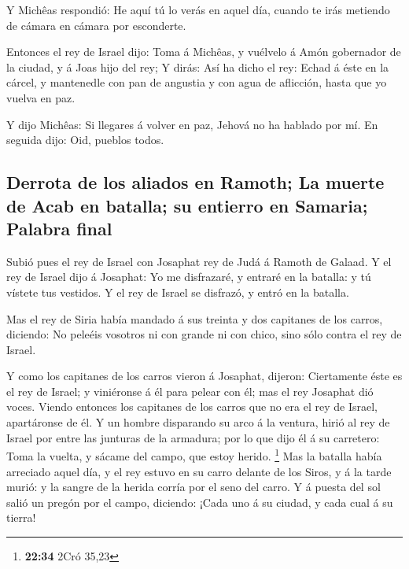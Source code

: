  Y Michêas respondió: He aquí tú lo verás en aquel día,
cuando te irás metiendo de cámara en cámara por esconderte.

 Entonces el rey de Israel dijo: Toma á Michêas, y
vuélvelo á Amón gobernador de la ciudad, y á Joas hijo del rey;
 Y dirás: Así ha dicho el rey: Echad á éste en la cárcel,
y mantenedle con pan de angustia y con agua de aflicción, hasta que yo
vuelva en paz.

 Y dijo Michêas: Si llegares á volver en paz, Jehová no
ha hablado por mí. En seguida dijo: Oid, pueblos todos.

\hypertarget{derrota-de-los-aliados-en-ramoth-la-muerte-de-acab-en-batalla-su-entierro-en-samaria-palabra-final}{%
\subsection{Derrota de los aliados en Ramoth; La muerte de Acab en
batalla; su entierro en Samaria; Palabra
final}\label{derrota-de-los-aliados-en-ramoth-la-muerte-de-acab-en-batalla-su-entierro-en-samaria-palabra-final}}

 Subió pues el rey de Israel con Josaphat rey de Judá á
Ramoth de Galaad.  Y el rey de Israel dijo á Josaphat: Yo
me disfrazaré, y entraré en la batalla: y tú vístete tus vestidos. Y el
rey de Israel se disfrazó, y entró en la batalla.

 Mas el rey de Siria había mandado á sus treinta y dos
capitanes de los carros, diciendo: No peleéis vosotros ni con grande ni
con chico, sino sólo contra el rey de Israel.

 Y como los capitanes de los carros vieron á Josaphat,
dijeron: Ciertamente éste es el rey de Israel; y viniéronse á él para
pelear con él; mas el rey Josaphat dió voces.  Viendo
entonces los capitanes de los carros que no era el rey de Israel,
apartáronse de él.  Y un hombre disparando su arco á la
ventura, hirió al rey de Israel por entre las junturas de la armadura;
por lo que dijo él á su carretero: Toma la vuelta, y sácame del campo,
que estoy herido. \footnote{\textbf{22:34} 2Cró 35,23} 
Mas la batalla había arreciado aquel día, y el rey estuvo en su carro
delante de los Siros, y á la tarde murió: y la sangre de la herida
corría por el seno del carro.  Y á puesta del sol salió
un pregón por el campo, diciendo: ¡Cada uno á su ciudad, y cada cual á
su tierra!

